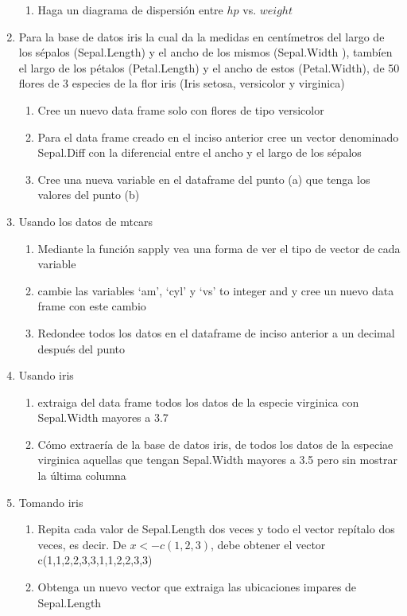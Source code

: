 \documentclass[12pt]{article} %
\begin{document}
\begin{enumerate}
\begin{enumerate}
\item Haga un diagrama de dispersión entre $hp$ vs. $weight$
\end{enumerate}
\item Para la base de datos iris la cual da la medidas en centímetros del largo de los sépalos (Sepal.Length) y el ancho de los mismos (Sepal.Width ), tambíen el largo de los pétalos (Petal.Length) y el ancho de  estos (Petal.Width), de 50 flores de 3 especies de la flor iris (Iris setosa, versicolor y virginica)
\begin{enumerate}
\item Cree un nuevo data frame solo con flores de tipo versicolor
\item Para el data frame creado en el inciso anterior cree un vector denominado Sepal.Diff con la diferencial entre el ancho y el largo de los sépalos
\item Cree una nueva variable en el dataframe del punto (a) que tenga los valores del punto (b)
\end{enumerate}
\item Usando los datos de mtcars
\begin{enumerate}
\item Mediante la función sapply vea una forma de ver el tipo de vector de cada variable
\item cambie las variables ‘am’, ‘cyl’ y ‘vs’ to integer and y cree un nuevo data frame con este cambio
\item Redondee todos los datos en el dataframe de inciso anterior a un decimal después del punto
\end{enumerate}
\item Usando iris
\begin{enumerate}
\item extraiga del data frame todos los datos de la especie virginica con Sepal.Width mayores a 3.7
\item Cómo extraería de la base de datos iris, de todos los datos de la especiae virginica aquellas que tengan Sepal.Width mayores a 3.5 pero sin mostrar la última columna
\end{enumerate}
\item Tomando iris
\begin{enumerate}
\item Repita cada valor de Sepal.Length dos veces y todo el vector repítalo dos veces, es decir. De $x<-c(1,2,3)$, debe obtener el vector c(1,1,2,2,3,3,1,1,2,2,3,3)
\item Obtenga un nuevo vector que extraiga las ubicaciones impares de Sepal.Length

\end{enumerate}
\end{enumerate}
\end{document}
